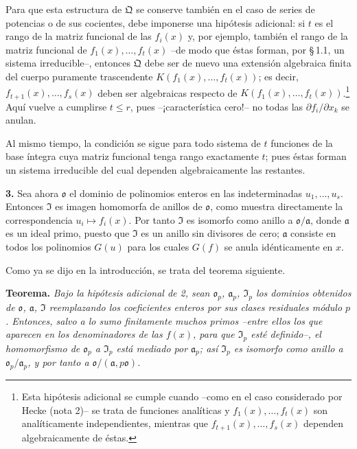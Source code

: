 Para que esta estructura de $\mathfrak{Q}$ se conserve también en el caso de series de potencias o de sus cocientes, debe imponerse una hipótesis adicional: si $t$ es el rango de la matriz funcional de las $f_i(x)$ y, por ejemplo, también el rango de la matriz funcional de $f_1(x),\ldots,f_t(x)$ --de modo que éstas forman, por \S\,1.1, un sistema irreducible--, entonces $\mathfrak{Q}$ debe ser de nuevo una extensión algebraica finita del cuerpo puramente trascendente $K(f_1(x),\ldots,f_t(x))$; es decir, $f_{t+1}(x),\ldots,f_s(x)$ deben ser algebraicas respecto de $K(f_1(x),\ldots,f_t(x))$.\footnote{Esta hipótesis adicional se cumple cuando --como en el caso considerado por Hecke (nota 2)-- se trata de funciones analíticas y $f_1(x),\ldots,f_t(x)$ son analíticamente independientes, mientras que $f_{t+1}(x),\ldots,f_s(x)$ dependen algebraicamente de éstas.} Aquí vuelve a cumplirse $t\le r$, pues --¡característica cero!-- no todas las $\partial f_i/\partial x_k$ se anulan.

Al mismo tiempo, la condición se sigue para todo sistema de $t$ funciones de la base íntegra cuya matriz funcional tenga rango exactamente $t$; pues éstas forman un sistema irreducible del cual dependen algebraicamente las restantes.

\medskip\noindent\textbf{3.}
Sea ahora $\mathfrak{o}$ el dominio de polinomios enteros en las indeterminadas $u_1,\ldots,u_s$. Entonces $\mathfrak{I}$ es imagen homomorfa de anillos de $\mathfrak{o}$, como muestra directamente la correspondencia $u_i\mapsto f_i(x)$. Por tanto $\mathfrak{I}$ es isomorfo como anillo a $\mathfrak{o}/\mathfrak{a}$, donde $\mathfrak{a}$ es un ideal primo, puesto que $\mathfrak{I}$ es un anillo sin divisores de cero; $\mathfrak{a}$ consiste en todos los polinomios $G(u)$ para los cuales $G(f)$ se anula idénticamente en $x$.

Como ya se dijo en la introducción, se trata del teorema siguiente.

\medskip\noindent\textbf{Teorema.}
\emph{Bajo la hipótesis adicional de 2, sean $\mathfrak{o}_p$, $\mathfrak{a}_p$, $\mathfrak{I}_p$ los dominios obtenidos de $\mathfrak{o}$, $\mathfrak{a}$, $\mathfrak{I}$ reemplazando los coeficientes enteros por sus clases residuales módulo $p$. Entonces, salvo a lo sumo finitamente muchos primos --entre ellos los que aparecen en los denominadores de las $f(x)$, para que $\mathfrak{I}_p$ esté definido--, el homomorfismo de $\mathfrak{o}_p$ a $\mathfrak{I}_p$ está mediado por $\mathfrak{a}_p$; así $\mathfrak{I}_p$ es isomorfo como anillo a $\mathfrak{o}_p/\mathfrak{a}_p$, y por tanto a $\mathfrak{o}/(\mathfrak{a},p\mathfrak{o})$.}

